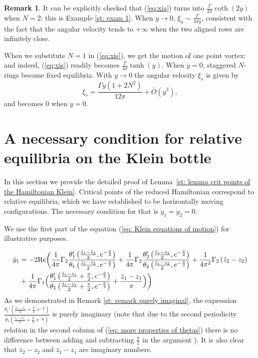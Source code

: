 \documentclass[11pt,twoside]{article}
\theoremstyle{definition}
\newtheorem{rem}[theorem]{Remark}
\numberwithin{equation}{section}
\begin{document}
\begin{rem}
It can be explicitly checked that (\ref{eq:xia}) turns into $\frac{\Gamma}{2\pi}\coth(2y)$ when $N=2$: this is Example \ref{st: exam 1}. When $y\to 0$, $\xi_a\sim\frac{\Gamma}{4\pi y}$, consistent with the fact that the angular velocity tends to $+\infty$ when the two aligned rows are infinitely close.

When we substitute $N=1$ in (\ref{eq:xis}), we get the motion of one point vortex: and indeed, (\ref{eq:xis}) readily becomes $\frac{\Gamma}{4\pi}\tanh(y)$. When $y=0$, staggered $N$-rings become fixed equilibria. With $y\to0$ the angular velocity $\xi_s$ is given by
\[
\xi_s = \frac{\Gamma y \left(1 + 2N^2\right)}{12 \pi } + \bar{O}(y^3),
\]
and becomes 0 when $y=0$.
\end{rem}   
\section{A necessary condition for relative equilibria on the Klein bottle}
\label{sec: Appendix B }
In this section we provide the detailed proof of Lemma~\ref{st: lemma crit points of the Hamiltonian Klein}.
Critical points of the reduced Hamiltonian correspond to relative equilibria, which we have established to be horizontally moving configurations. The necessary condition for that is $\dot{y}_1 = \dot{y}_2=0$. 

We use the first part of the equation (\ref{eq: Klein equations of motion}) for illustrative purposes. 

\begin{equation}
    \begin{split}
     \dot{y}_1 &=  -2\mathrm{Re}\biggl( \frac{1}{4\pi}\Gamma_2\frac{\theta'_1\left(\frac{\bar{z}_1 - \bar{z}_2}{2},e^{-\frac{\pi}{2}}  \right)}{\theta_1\left(\frac{\bar{z}_1 - \bar{z}_2}{2},e^{-\frac{\pi}{2}}  \right)}  +\frac{1}{4\pi}\Gamma_2\frac{\theta'_2\left(\frac{\bar{z}_1 - z_2}{2},e^{-\frac{\pi}{2}} \right)}{\theta_2\left(\frac{\bar{z}_1 - z_2}{2},e^{-\frac{\pi}{2}}  \right)} + \frac{1}{4\pi^2}\Gamma_2\left(\bar{z}_2-z_2\right) \\&+ \frac{1}{4\pi}\Gamma_1\Bigl(\frac{\theta_1'\left(\frac{\bar{z}_1-z_1}{2} + \frac{\pi}{2}, e^{-\frac{\pi}{2}}\right)}{\theta_1\left(\frac{\bar{z}_1-z_1}{2} + \frac{\pi}{2}, e^{-\frac{\pi}{2}}\right)} + \frac{\bar{z}_1-z_1}{\pi}\Bigr)\biggr)
    \end{split}
\end{equation}
As we demonstrated in Remark
\ref{st: remark purely imaginal}, the expression $\frac{\theta_1'\left(\frac{\bar{z}_1-z_1}{2} + \frac{\pi}{2}, e^{-\frac{\pi}{2}}\right)}{\theta_1\left(\frac{\bar{z}_1-z_1}{2} + \frac{\pi}{2}, e^{-\frac{\pi}{2}}\right)} $ is purely imaginary (note that due to the second periodicity relation in the second column of (\ref{eq: more properties of thetas}) there is no difference between adding and subtracting $\frac{\pi}{2}$ in the argument ). It is also clear that $\bar{z}_2-z_2$ and $\bar{z}_1-z_1$ are imaginary numbers. 
\end{document}
